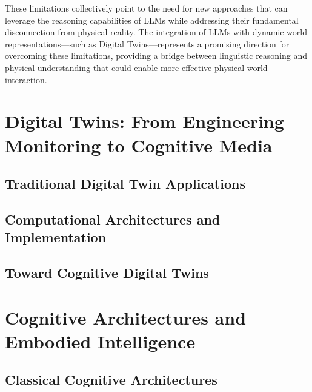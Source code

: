 These limitations collectively point to the need for new approaches that can leverage the reasoning capabilities of LLMs while addressing their fundamental disconnection from physical reality. The integration of LLMs with dynamic world representations—such as Digital Twins—represents a promising direction for overcoming these limitations, providing a bridge between linguistic reasoning and physical understanding that could enable more effective physical world interaction.

\section{Digital Twins: From Engineering Monitoring to Cognitive Media}

\subsection{Traditional Digital Twin Applications}

\subsection{Computational Architectures and Implementation}

\subsection{Toward Cognitive Digital Twins}

\section{Cognitive Architectures and Embodied Intelligence}

\subsection{Classical Cognitive Architectures}

